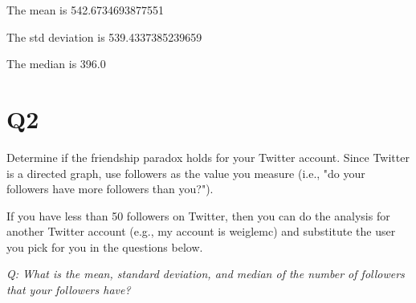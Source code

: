 \documentclass[12pt]{article}
\begin{document}
The mean is 542.6734693877551

The std deviation is 539.4337385239659

The median is 396.0




\section*{Q2}
Determine if the friendship paradox holds for your Twitter account. Since Twitter is a directed graph, use followers as the value you measure (i.e., "do your followers have more followers than you?").

If you have less than 50 followers on Twitter, then you can do the analysis for another Twitter account (e.g., my account is weiglemc) and substitute the user you pick for you in the questions below.

\emph{Q: What is the mean, standard deviation, and median of the number of followers that your followers have?}
\end{document}
